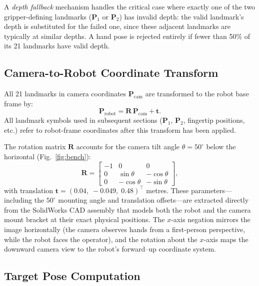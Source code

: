 \documentclass{ieeeaccess}
\newcommand{\vect}[1]{\mathbf{#1}}
\newcommand{\mat}[1]{\mathbf{#1}}
\begin{document}
A \emph{depth fallback} mechanism handles the critical case where
exactly one of the two gripper-defining landmarks ($\vect{P}_1$ or
$\vect{P}_2$) has invalid depth: the valid landmark's depth is
substituted for the failed one, since these adjacent landmarks are
typically at similar depths. A hand pose is rejected entirely if fewer
than 50\% of its 21 landmarks have valid depth.


\subsection{Camera-to-Robot Coordinate Transform}
\label{sec:transform}

All 21 landmarks in camera coordinates $\vect{P}_{\text{cam}}$ are
transformed to the robot base frame by:
\begin{equation}\label{eq:transform}
  \vect{P}_{\text{robot}} = \mat{R}\,\vect{P}_{\text{cam}} + \vect{t}.
\end{equation}
All landmark symbols used in subsequent sections ($\vect{P}_1$,
$\vect{P}_2$, fingertip positions, etc.) refer to robot-frame
coordinates after this transform has been applied.

The rotation matrix $\mat{R}$ accounts for the
camera tilt angle $\theta = 50^{\circ}$ below the horizontal
(Fig.~\ref{fig:bench}):
\begin{equation}\label{eq:Rcam}
  \mat{R} =
  \begin{bmatrix}
    -1 & 0 & 0 \\
    0 & \sin\theta & -\cos\theta \\
    0 & -\cos\theta & -\sin\theta
  \end{bmatrix},
\end{equation}
with translation $\vect{t} = (0.04,\; -0.049,\; 0.48)^\top$
metres. These parameters---including the $50^{\circ}$ mounting angle and
translation offsets---are extracted directly from the SolidWorks CAD
assembly that models both the robot and the camera mount bracket at
their exact physical positions.
The $x$-axis negation mirrors the image horizontally (the camera
observes hands from a first-person perspective, while the robot faces
the operator), and the rotation about the $x$-axis maps the downward
camera view to the robot's forward--up coordinate system.

\subsection{Target Pose Computation}
\label{sec:targetpose}
\end{document}
